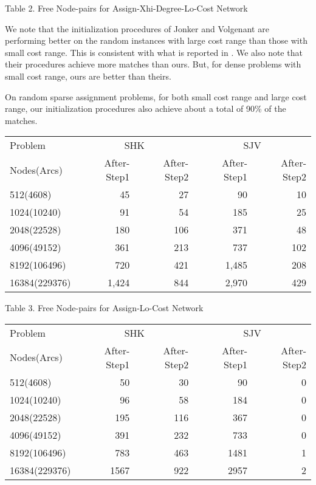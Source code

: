 \vskip 2pt
{Table 2. Free Node-pairs for Assign-Xhi-Degree-Lo-Cost Network}
\vskip 5pt

We note that the
initialization procedures of Jonker and Volgenant are performing better
on the random instances with large cost range than those with small
cost range. This is consistent with what is reported in \cite{jon1}. We
also note that their procedures achieve more matches than ours. But,
for dense problems with small cost range, ours are better than theirs.

On random sparse assignment problems, for both small cost range and
large cost range, our initialization procedures also
achieve about a total of 90\% of the matches. 


\vskip 5pt
{\small
\begin{tabular}{|l|rr|rr|} \hline
 Problem & \multicolumn{2}{c|}{SHK}& \multicolumn{2}{c|}{SJV}\\
Nodes(Arcs)&After-Step1 &After-Step2 &After-Step1 &After-Step2\\ \hline
512(4608)& 45& 27& 90& 10\\ 
1024(10240)& 91& 54& 185& 25\\ 
2048(22528)& 180& 106& 371& 48\\ 
4096(49152)& 361& 213& 737& 102\\ 
8192(106496)& 720& 421& 1,485& 208\\ 
16384(229376)& 1,424& 844& 2,970& 429\\ \hline
\end{tabular}
}

\vskip 2pt
{Table 3. Free Node-pairs for Assign-Lo-Cost Network}
\vskip 5pt

\vskip 5pt
{\small
\begin{tabular}{|l|rr|rr|} \hline
 Problem & \multicolumn{2}{c|}{SHK}& \multicolumn{2}{c|}{SJV}\\
Nodes(Arcs)&After-Step1 &After-Step2 &After-Step1 &After-Step2\\ \hline
512(4608)& 50& 30& 90& 0\\ 
1024(10240)& 96& 58& 184& 0\\ 
2048(22528)& 195& 116& 367& 0\\ 
4096(49152)& 391& 232& 733& 0\\ 
8192(106496)& 783& 463& 1481& 1\\ 
16384(229376)& 1567& 922& 2957& 2\\ \hline
\end{tabular}
}


